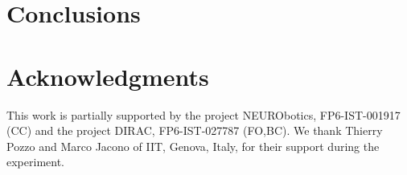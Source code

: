 \documentclass[conference,letterpaper,10pt]{ieeeconf}
\begin{document}
\section{Conclusions}
\label{sec:concl}



\section*{Acknowledgments}

This work is partially supported by the project NEURObotics,
FP6-IST-001917 (CC) and the project DIRAC, FP6-IST-027787 (FO,BC). We
thank Thierry Pozzo and Marco Jacono of IIT, Genova, Italy, for their
support during the experiment.

{\small


}
\end{document}
